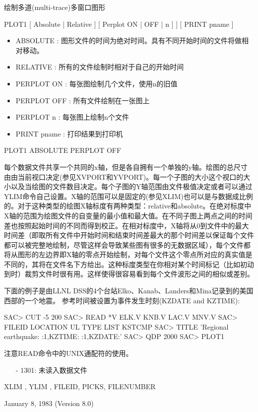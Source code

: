 \label{cmd:plot1}

绘制多道(multi-trace)多窗口图形

PLOT1 [ Absolute | Relative ] [ Perplot ON | OFF | n ] ] [ PRINT pname ]

\begin{itemize}
\item ABSOLUTE : 图形文件的时间为绝对时间。具有不同开始时间的文件将做相对移动。
\item RELATIVE : 所有的文件绘制时相对于自己的开始时间
\item PERPLOT ON : 每张图绘制几个文件，使用n的旧值 
\item PERPLOT OFF : 所有文件绘制在一张图上 
\item PERPLOT n : 每张图上绘制n个文件 
\item PRINT pname : 打印结果到打印机 
\end{itemize}

PLOT1 ABSOLUTE PERPLOT OFF

每个数据文件共享一个共同的x轴，但是各自拥有一个单独的y轴。绘图的总尺寸由由当前视口决定(参见XVPORT和YVPORT)。每一个子图的大小这个视口的大小以及当绘图的文件数目决定。每个子图的Y轴范围由文件极值决定或者可以通过YLIM命令自己设置。X轴的范围可以是固定的(参见XLIM)也可以是与数据成比例的。对于这种类型的绘图X轴标度有两种类型：relative和absolute。在绝对标度中X轴的范围为绘图文件的自变量的最小值和最大值。在不同子图上两点之间的时间差也按照起始时间的不同而得到校正。在相对标度中，X轴将从0到文件中的最大时间差（即取所有文件中开始时间和结束时间差最大的那个时间差以保证每个文件都可以被完整地绘制，尽管这样会导致某些图有很多的无数据区域），每个文件都将从图形的左边界即X轴的零点开始绘制，对每个文件这个零点所对应的真实值是不同的，其将在文件名下方给出。这种标度类型在你相对某个时间标记（比如初动到时）裁剪文件时很有用。这样使得很容易看到每个文件波形之间的相似或差别。

下面的例子是由LLNL DSS的4个台站Elko、Kanab、Landers和Mina记录到的美国西部的一个地震。
参考时间被设置为事件发生时刻(KZDATE and KZTIME):
\begin{SACCode}
SAC> CUT -5 200
SAC> READ *V
 ELK.V KNB.V LAC.V MNV.V
SAC> FILEID LOCATION UL TYPE LIST KSTCMP
SAC> TITLE 'Regional earthquake:  :1,KZTIME:  :1,KZDATE:'
SAC> QDP 2000
SAC> PLOT1
\end{SACCode}
注意READ命令中的UNIX通配符的使用。

\begin{itemize}
\item[-]1301: 未读入数据文件
\end{itemize}

XLIM , YLIM , FILEID, PICKS, FILENUMBER

January 8, 1983 (Version 8.0)
